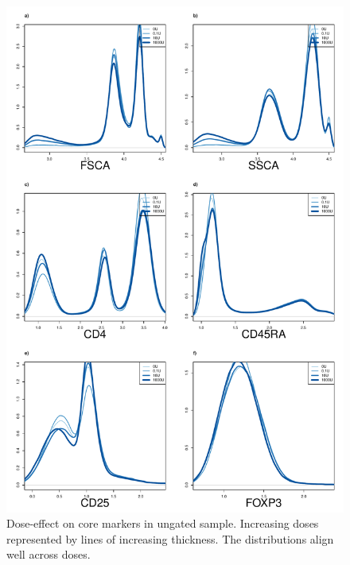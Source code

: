 \hspace{-2cm}
\begin{figure}[h]
\centering
\includegraphics[scale=.3]{IL2/figures/dose-effect.pdf}
{Dose-effect on core markers in ungated sample.}
{
Increasing doses represented by lines of increasing thickness.
The distributions align well across doses.
}
\end{figure}

